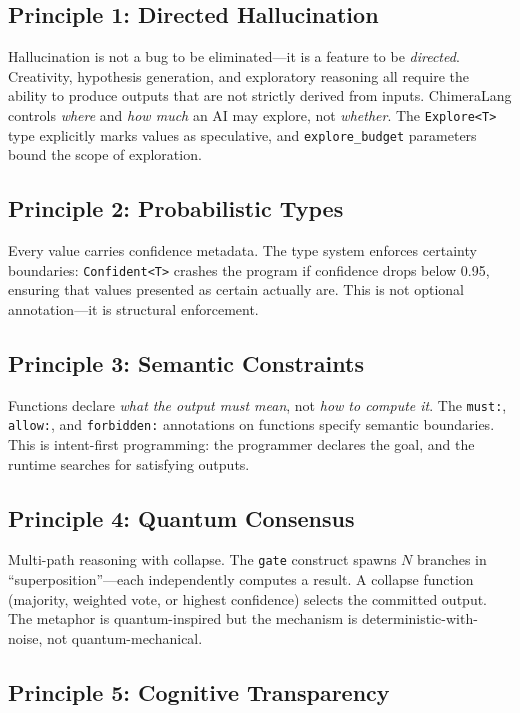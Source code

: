 \documentclass[11pt,a4paper]{article}
\begin{document}
\subsection{Principle 1: Directed Hallucination}

Hallucination is not a bug to be eliminated---it is a feature to be
\emph{directed}. Creativity, hypothesis generation, and exploratory reasoning
all require the ability to produce outputs that are not strictly derived from
inputs. ChimeraLang controls \emph{where} and \emph{how much} an AI may
explore, not \emph{whether}. The \texttt{Explore<T>} type explicitly marks
values as speculative, and \texttt{explore\_budget} parameters bound the
scope of exploration.

\subsection{Principle 2: Probabilistic Types}

Every value carries confidence metadata. The type system enforces certainty
boundaries: \texttt{Confident<T>} crashes the program if confidence drops below
0.95, ensuring that values presented as certain actually are. This is not
optional annotation---it is structural enforcement.

\subsection{Principle 3: Semantic Constraints}

Functions declare \emph{what the output must mean}, not \emph{how to compute
it}. The \texttt{must:}, \texttt{allow:}, and \texttt{forbidden:} annotations on
functions specify semantic boundaries. This is intent-first programming: the
programmer declares the goal, and the runtime searches for satisfying outputs.

\subsection{Principle 4: Quantum Consensus}

Multi-path reasoning with collapse. The \texttt{gate} construct spawns $N$
branches in ``superposition''---each independently computes a result. A collapse
function (majority, weighted vote, or highest confidence) selects the committed
output. The metaphor is quantum-inspired but the mechanism is
deterministic-with-noise, not quantum-mechanical.

\subsection{Principle 5: Cognitive Transparency}
\end{document}
